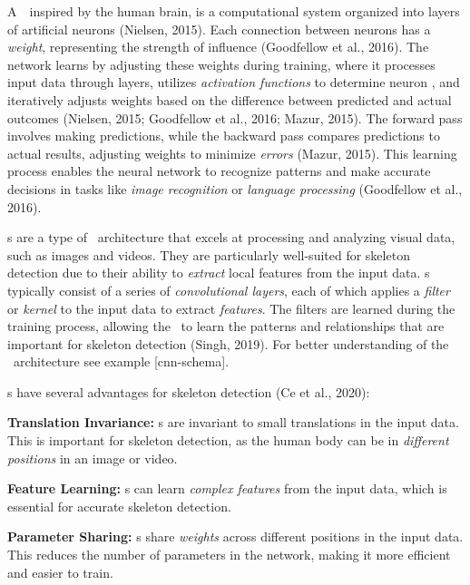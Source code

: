 A~\NN\, inspired by the human brain, is a computational system organized into layers of artificial neurons (\scc Nielsen, 2015). Each connection between neurons has a {\em weight}, representing the strength of influence (\scc Goodfellow et al., 2016). The network learns by adjusting these weights during training, where it processes input data through layers, utilizes {\em activation functions} to determine neuron , and iteratively adjusts weights based on the difference between predicted and actual outcomes (\scc Nielsen, 2015; \scc Goodfellow et al., 2016; \scc Mazur, 2015). The forward pass involves making predictions, while the backward pass compares predictions to actual results, adjusting weights to minimize {\em errors} (\scc Mazur, 2015). This learning process enables the neural network to recognize patterns and make accurate decisions in tasks like {\em image recognition} or {\em language processing} (\scc Goodfellow et al., 2016).

\CNN\-s are a type of \NN\ architecture that excels at processing and analyzing visual data, such as images and videos. They are particularly well-suited for skeleton detection due to their ability to {\em extract} local features from the input data. \CNN\-s typically consist of a series of {\em convolutional layers}, each of which applies a {\em filter} or {\em kernel} to the input data to extract {\em features}. The filters are learned during the training process, allowing the \CNN\ to learn the patterns and relationships that are important for skeleton detection (\scc Singh, 2019). For better understanding of the \CNN\ architecture see example [cnn-schema].

\CNN\-s have several advantages for skeleton detection (\scc Ce et al., 2020):

\startitemize[1]
    \item {\bf Translation Invariance:} \CNN\-s are invariant to small translations in the input data. This is important for skeleton detection, as the human body can be in {\em different positions} in an image or video.
    \item {\bf Feature Learning:} \CNN\-s can learn {\em complex features} from the input data, which is essential for accurate skeleton detection.
    \item {\bf Parameter Sharing:} \CNN\-s share {\em weights} across different positions in the input data. This reduces the number of parameters in the network, making it more efficient and easier to train.
\stopitemize

